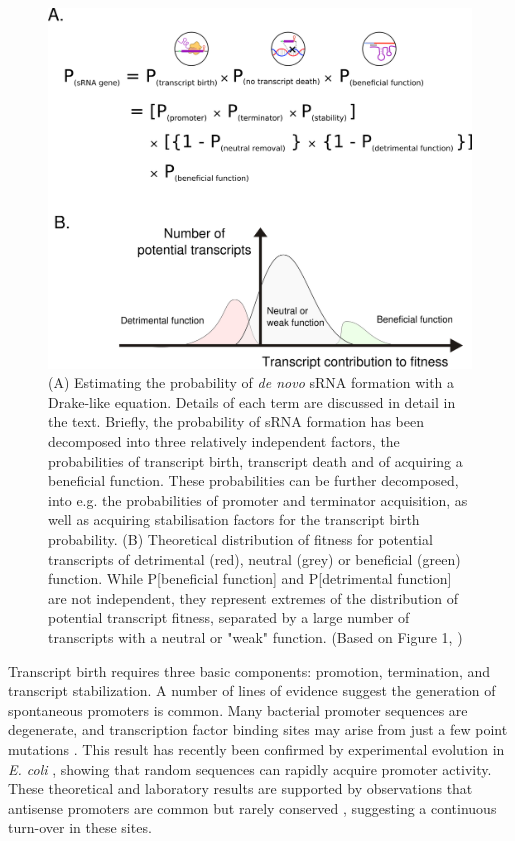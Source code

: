 \begin{figure}[H]
  \includegraphics[scale=1.2]{lit_review/drake_eqn_final_2.png}
  \caption{(A) Estimating the probability of \textit{de novo} sRNA formation with a Drake-like equation. Details of each term are discussed in detail in the text. Briefly, the probability of sRNA formation has been decomposed into three relatively independent factors, the probabilities of transcript birth, transcript death and of acquiring a beneficial function. These probabilities can be further decomposed, into e.g. the probabilities of promoter and terminator acquisition, as well as acquiring stabilisation factors for the transcript birth probability.
(B) Theoretical distribution of fitness for potential transcripts of detrimental (red), neutral (grey) or beneficial (green) function. While P[beneficial function] and P[detrimental function] are not independent, they represent extremes of the distribution of potential transcript fitness, separated by a large number of transcripts with a neutral or "weak" function. (Based on Figure 1, \cite{Martin2016-re}) }
  \label{fig:drake}
\end{figure}

Transcript birth requires three basic components: promotion, termination, and transcript stabilization. A number of lines of evidence suggest the generation of spontaneous promoters is common. Many bacterial promoter sequences are degenerate, and transcription factor binding sites may arise from just a few point mutations \citep{Stone2001-yd}. This result has recently been confirmed by experimental evolution in \textit{E. coli} \citep{Yona2018-hx}, showing that random sequences can rapidly acquire promoter activity. These theoretical and laboratory results are supported by observations that antisense promoters are common \citep{Dornenburg2010-rq,Thomason2015-ky} but rarely conserved \citep{Raghavan2012-wr,Shao2014-hq}, suggesting a continuous turn-over in these sites.\par

